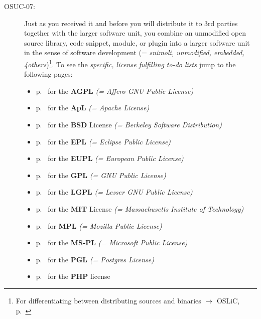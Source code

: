 \begin{description}
\item[OSUC-07:]\label{OSUC-07-DEF} Just as you received it and before you will
distribute it to 3rd parties together with the larger software unit, you combine
an unmodified open source library, code snippet, module, or plugin into a larger
software unit in the sense of software development (= \textit{snimoli,
unmodified, embedded, 4others})\footnote{For differentiating between
distributing sources and binaries $\rightarrow$ OSLiC, p.\
\pageref{sec:SourceBinaryDifference}}.
To see the \textit{specific, license fulfilling to-do lists} jump to the
following pages:
   \begin{itemize}
    \item p.\ \pageref{OSUC-07-AGPL} for the \textbf{AGPL}
      \textit{(= Affero GNU Public License)} 
    \item p.\ \pageref{OSUC-07-Apache20} for the \textbf{ApL}
      \textit{(= Apache License)}
    \item p.\ \pageref{OSUC-07-BSD} for the \textbf{BSD} License
      \textit{(= Berkeley Software Distribution)}
    \item p.\ \pageref{OSUC-07-EPL} for the \textbf{EPL}
      \textit{(= Eclipse Public License)}     
    \item p.\ \pageref{OSUC-07-EUPL} for the \textbf{EUPL}
      \textit{(= European Public License)} 
    \item p.\ \pageref{OSUC-07-GPL} for the \textbf{GPL}
       \textit{(= GNU Public License)} 
    \item p.\ \pageref{OSUC-07-LGPL} for the \textbf{LGPL}
      \textit{(= Lesser GNU Public License)}           
    \item p.\ \pageref{OSUC-07-MIT} for the \textbf{MIT} License
       \textit{(= Massachusetts Institute of Technology)} 
    \item p.\ \pageref{OSUC-07-MPL} for \textbf{MPL}
      \textit{(= Mozilla Public License)}     
    \item p.\ \pageref{OSUC-07-MS-PL} for the \textbf{MS-PL}
      \textit{(= Microsoft Public License)} 
    \item p.\ \pageref{OSUC-07-PGL} for the \textbf{PGL}
      \textit{(= Postgres License)} 
    \item p.\ \pageref{OSUC-07-PHP} for the \textbf{PHP} license 
  \end{itemize}


\end{description}

